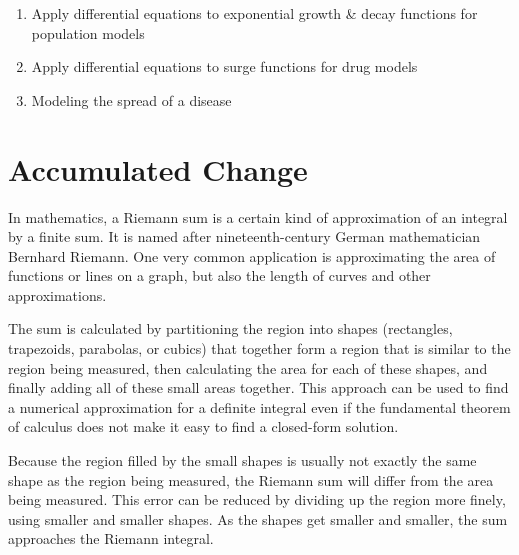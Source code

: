 \begin{enumerate}
    \item Apply differential equations to exponential growth \& decay functions for population models
    \item Apply differential equations to surge functions for drug models
    \item Modeling the spread of a disease
\end{enumerate}

\section{Accumulated Change}
\label{sec:accumulated-change}

In mathematics, a Riemann sum is a certain kind of approximation of an integral by a finite sum. It is named after nineteenth-century German mathematician Bernhard Riemann. One very common application is approximating the area of functions or lines on a graph, but also the length of curves and other approximations.



The sum is calculated by partitioning the region into shapes (rectangles, trapezoids, parabolas, or cubics) that together form a region that is similar to the region being measured, then calculating the area for each of these shapes, and finally adding all of these small areas together. This approach can be used to find a numerical approximation for a definite integral even if the fundamental theorem of calculus does not make it easy to find a closed-form solution.



Because the region filled by the small shapes is usually not exactly the same shape as the region being measured, the Riemann sum will differ from the area being measured. This error can be reduced by dividing up the region more finely, using smaller and smaller shapes. As the shapes get smaller and smaller, the sum approaches the Riemann integral.





